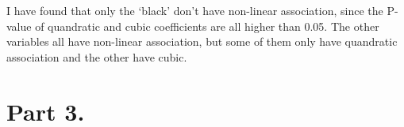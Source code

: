 \documentclass[]{article}
\begin{document}
I have found that only the `black' don't have non-linear association,
since the P-value of quandratic and cubic coefficients are all higher
than 0.05. The other variables all have non-linear association, but some
of them only have quandratic association and the other have cubic.

\hypertarget{part-3.}{%
\section{Part 3.}\label{part-3.}}
\end{document}
